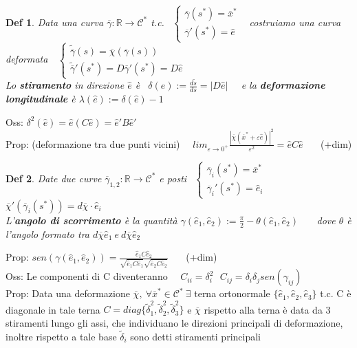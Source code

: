 \documentclass{article}
\theoremstyle{unnumbered}
\newtheorem* {theoremT}{Def}
\theoremstyle{unnumbered1}
\newenvironment{defi}{\begin{gBox}\begin{theoremT}}{\end{theoremT}\end{gBox}}
\begin{document}
\begin{defi}
Data una curva $\overline{\gamma}:\mathbb{R}\rightarrow\mathcal{C}^*$ t.c. $\ \ \begin{cases}
    \overline{\gamma}(s^*)=\overline{x}^*\\
    \overline{\gamma}'(s^*)=\hat{e}
\end{cases}$ \ costruiamo una curva deformata\ \ $\begin{cases}
    \widetilde{\overline{\gamma}}(s)=\overline{\chi}(\overline{\gamma}(s))\\
    \widetilde{\overline{\gamma}}'(s^*)=D\overline{\gamma}'(s^*)=D\hat{e}
\end{cases}$ \\
%
Lo \textbf{stiramento} in direzione $\hat{e}$ è
\ $\delta(\hat{e}):=\frac{d\widetilde{s}}{ds}=|D\hat{e}|$ \ \ e la \textbf{deformazione longitudinale} è $\lambda(\hat{e}) :=\delta(\hat{e})-1$
\end{defi}
%
Oss: $\delta^2(\hat{e})=\hat{e}(C\hat{e})=\hat{e}'B\hat{e}'$\\
%
%
%
Prop: (deformazione tra due punti vicini) \ \ $lim_{\varepsilon\rightarrow 0^+} \frac{|\overline{\chi}(\overline{x}^*+\varepsilon\hat{e})|^2}{\varepsilon^2}=\hat{e}C\hat{e}$ \ \ \ (+dim) \\
%
%
%
\begin{defi}
Date due curve $\overline{\gamma}_{1,2}:\mathbb{R}\rightarrow\mathcal{C}^*$ e posti $\ \ \begin{cases}
    \overline{\gamma}_i(s^*)=\overline{x}^*\\
    \overline{\gamma}_i'(s^*)=\hat{e}_i
\end{cases}$ \ \ \ $\overline{\chi}'(\overline{\gamma}_i(s^*))=d\overline{\chi}\cdot\hat{e}_i$\\
%
L'\textbf{angolo di scorrimento} è la quantità $\gamma(\hat{e}_1,\hat{e}_2):= \frac{\pi}{2}-\theta(\hat{e}_1,\hat{e}_2)$ \ \ \ dove $\theta$ è l'angolo formato tra $d\overline{\chi}\hat{e}_1 \ e \ d\overline{\chi}\hat{e}_2$
\end{defi}
%
Prop: $sen( \gamma(\hat{e}_1,\hat{e}_2))= \frac{\hat{e}_1 C \hat{e}_2}{\sqrt{\hat{e}_1 C \hat{e}_1} \sqrt{\hat{e}_2 C \hat{e}_2}}$ \ \ \ (+dim)\\
%
Oss: Le componenti di C diventeranno \ \ $C_{ii}=\delta_i^2 \ \ \ C_{ij}=\delta_i\delta_j sen(\gamma_{ij})$\\ %
%
%
%
Prop: Data una deformazione $\overline{\chi}, \ \forall\overline{x}^* \in \mathcal{C}^* \ \exists$ terna ortonormale $ \{\hat{e}_1, \hat{e}_2, \hat{e}_3\}$ t.c. C è diagonale in tale terna $C=diag\{\widetilde{\delta}^2_1, \widetilde{\delta}^2_2, \widetilde{\delta}^2_3\}$ e $\overline{\chi}$ rispetto alla terna è data da 3 stiramenti lungo gli assi, che individuano le direzioni principali di deformazione, inoltre rispetto a tale base $\widetilde{\delta}_i$ sono detti stiramenti principali \\ \\
\end{document}
